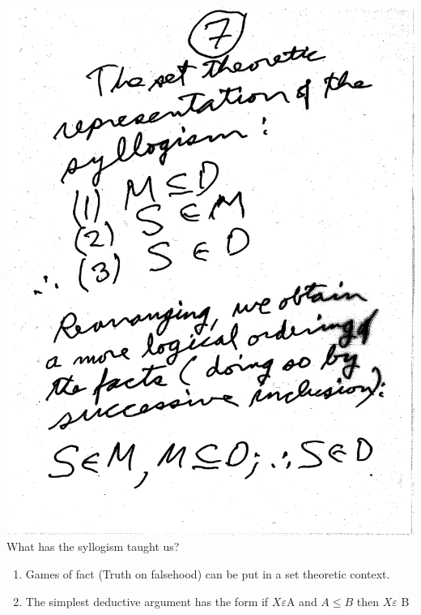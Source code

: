 \documentclass[10pt,a4paper]{article}
\begin{document}
\includegraphics[scale=.5]{Pages/ST_7} 
\newpage
What has the syllogism taught us?
\begin{enumerate}
\item Games of fact (Truth on falsehood) can be put in a set theoretic context.\\
\item The simplest deductive argument has the form if $X\varepsilon$A and $A\leq B$ then $X \varepsilon$ B
\end{enumerate}
\end{document}
